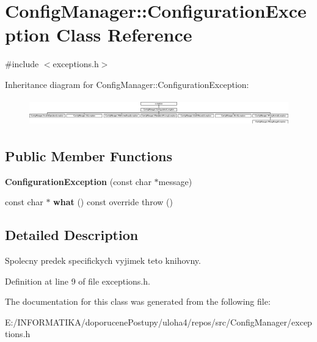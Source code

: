 \hypertarget{class_config_manager_1_1_configuration_exception}{}\section{Config\+Manager\+:\+:Configuration\+Exception Class Reference}
\label{class_config_manager_1_1_configuration_exception}


{\ttfamily \#include $<$exceptions.\+h$>$}

Inheritance diagram for Config\+Manager\+:\+:Configuration\+Exception\+:\begin{figure}[H]
\begin{center}
\leavevmode
\includegraphics[height=1.172161cm]{class_config_manager_1_1_configuration_exception}
\end{center}
\end{figure}
\subsection*{Public Member Functions}
\begin{DoxyCompactItemize}
\item 
{\bfseries Configuration\+Exception} (const char $\ast$message)\hypertarget{class_config_manager_1_1_configuration_exception_a7ab971ae1aa991968064f7414f233afd}{}\label{class_config_manager_1_1_configuration_exception_a7ab971ae1aa991968064f7414f233afd}

\item 
const char $\ast$ {\bfseries what} () const  override  throw ()\hypertarget{class_config_manager_1_1_configuration_exception_a2896099b9b4ced84a7359136105e9937}{}\label{class_config_manager_1_1_configuration_exception_a2896099b9b4ced84a7359136105e9937}

\end{DoxyCompactItemize}


\subsection{Detailed Description}
Spolecny predek specifickych vyjimek teto knihovny. 

Definition at line 9 of file exceptions.\+h.



The documentation for this class was generated from the following file\+:\begin{DoxyCompactItemize}
\item 
E\+:/\+I\+N\+F\+O\+R\+M\+A\+T\+I\+K\+A/doporucene\+Postupy/uloha4/repos/src/\+Config\+Manager/exceptions.\+h\end{DoxyCompactItemize}
